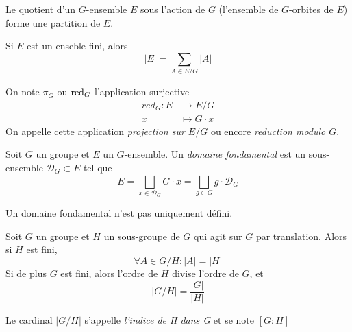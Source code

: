 \begin{cor}
	Le quotient d'un $G$-ensemble $E$ sous l'action de $G$ (l'ensemble de $G$-orbites de $E$)
	forme une partition de $E$.
\end{cor}

\begin{cor}
	Si $E$ est un enseble fini, alors
	\begin{equation*}
		|E| = \sum_{A \in E/G}|A|
	\end{equation*}
\end{cor}

\begin{defn}
	On note $\pi_G$ ou $\operatorname{red}_G$ l'application surjective
	\begin{align*}
		red_G : E &\to E/G \\
		x &\mapsto G \cdot x
	\end{align*}
	On appelle cette application \emph{projection sur $E/G$} ou encore
	\emph{reduction modulo $G$}.
\end{defn}

\begin{defn}
	Soit $G$ un groupe et $E$ un $G$-ensemble.
	Un \emph{domaine fondamental} est un sous-ensemble
	$\mathcal{D}_G \subset E$ tel que
	\begin{equation*}
		E = \bigsqcup_{x \in \mathcal{D}_G} G \cdot x
			= \bigsqcup_{g \in G} g \cdot \mathcal{D}_G
	\end{equation*}
\end{defn}

\begin{rmq}
	Un domaine fondamental n'est pas uniquement défini.
\end{rmq}


\begin{thm}
	Soit $G$ un groupe et $H$ un sous-groupe de $G$
	qui agit sur $G$ par translation. Alors si $H$ est fini,
	\begin{equation*}
		\forall A \in G/H: |A| = |H|
	\end{equation*}
	Si de plus $G$ est fini, alors l'ordre de $H$ divise l'ordre de $G$,
	et 
	\begin{equation*}
		|G/H| = \frac{|G|}{|H|}
	\end{equation*}
\end{thm}

\begin{notn}
	Le cardinal $|G/H|$ s'appelle \emph{l'indice de H dans G} et se note
	$[G : H]$
\end{notn}

